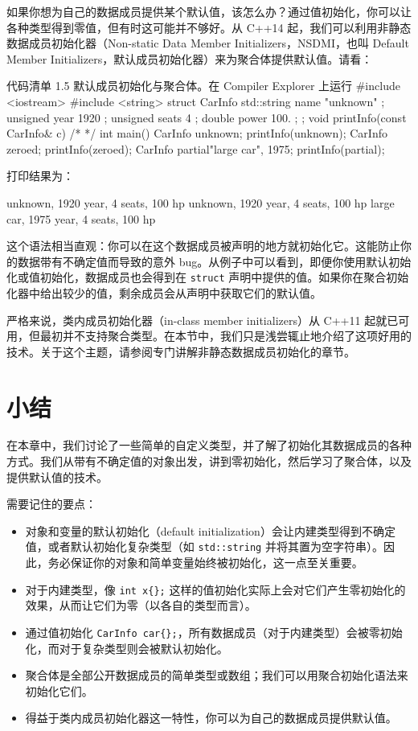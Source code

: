 如果你想为自己的数据成员提供某个默认值，该怎么办？通过值初始化，你可以让各种类型得到零值，但有时这可能并不够好。从 C++14 起，我们可以利用非静态数据成员初始化器（Non-static Data Member Initializers，NSDMI，也叫 Default Member Initializers，默认成员初始化器）来为聚合体提供默认值。请看：

\begin{codeboxt}[cpp]{代码清单 1.5 默认成员初始化与聚合体。在 Compiler Explorer 上运行}
#include <iostream>
#include <string>
struct CarInfo {
std::string name { "unknown" };
unsigned year { 1920 };
unsigned seats { 4 };
double power { 100. };
};
void printInfo(const CarInfo& c) { /* */ }
int main() {
CarInfo unknown;
printInfo(unknown);
CarInfo zeroed{};
printInfo(zeroed);
CarInfo partial{"large car", 1975};
printInfo(partial);
}
\end{codeboxt}

打印结果为：

\begin{codebox}[cpp]
unknown, 1920 year, 4 seats, 100 hp
unknown, 1920 year, 4 seats, 100 hp
large car, 1975 year, 4 seats, 100 hp
\end{codebox}

这个语法相当直观：你可以在这个数据成员被声明的地方就初始化它。这能防止你的数据带有不确定值而导致的意外 bug。从例子中可以看到，即便你使用默认初始化或值初始化，数据成员也会得到在 \texttt{struct} 声明中提供的值。如果你在聚合初始化器中给出较少的值，剩余成员会从声明中获取它们的默认值。

严格来说，类内成员初始化器（in-class member initializers）从 C++11 起就已可用，但最初并不支持聚合类型。在本节中，我们只是浅尝辄止地介绍了这项好用的技术。关于这个主题，请参阅专门讲解非静态数据成员初始化的章节。

\section{小结}

在本章中，我们讨论了一些简单的自定义类型，并了解了初始化其数据成员的各种方式。我们从带有不确定值的对象出发，讲到零初始化，然后学习了聚合体，以及提供默认值的技术。

需要记住的要点：

\begin{itemize}
\item 对象和变量的默认初始化（default initialization）会让内建类型得到不确定值，或者默认初始化复杂类型（如 \texttt{std::string} 并将其置为空字符串）。因此，务必保证你的对象和简单变量始终被初始化，这一点至关重要。
\item 对于内建类型，像 \texttt{int x\{\};} 这样的值初始化实际上会对它们产生零初始化的效果，从而让它们为零（以各自的类型而言）。
\item 通过值初始化 \texttt{CarInfo car\{\};}，所有数据成员（对于内建类型）会被零初始化，而对于复杂类型则会被默认初始化。
\item 聚合体是全部公开数据成员的简单类型或数组；我们可以用聚合初始化语法来初始化它们。
\item 得益于类内成员初始化器这一特性，你可以为自己的数据成员提供默认值。
\end{itemize}

